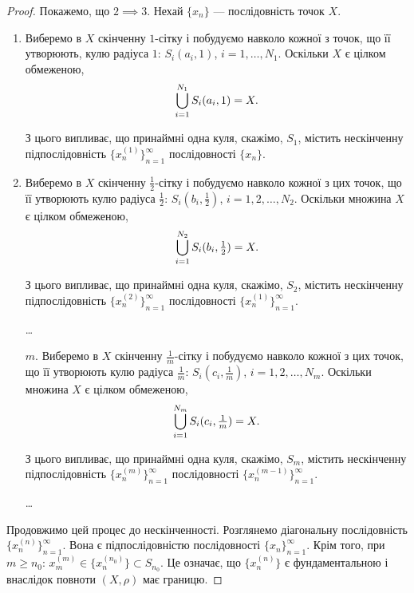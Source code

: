 \begin{proof}
Покажемо, що $2 \implies 3$. Нехай $\{x_n\}$ --- послідовність
точок $X$.
\begin{enumerate}
\item Виберемо в $X$ скінченну $1$-сітку і побудуємо навколо
кожної з точок, що її утворюють, кулю радіуса $1$:
$S_i(a_i, 1)$, $i = 1, \dots, N_1$. Оскільки $X$ є цілком обмеженою,
\begin{equation*}
    \operatorname*{\bigcup}_{i = 1}^{N_1} S_i(a_i, 1) = X.
\end{equation*}

З цього випливає, що принаймні одна куля, скажімо,
$S_1$, містить нескінченну підпослідовність $\{x_n^{(1)}\}_{n = 1}^\infty$
послідовності $\{x_n\}$.

\item Виберемо в $X$ скінченну $\frac{1}{2}$-сітку і побудуємо навколо
кожної з цих точок, що її утворюють кулю радіуса $\frac{1}{2}$:
$S_i(b_i, \frac{1}{2})$, $i = 1, 2, \dots, N_2$. Оскільки множина $X$ є цілком
обмеженою,
\begin{equation*}
    \operatorname*{\bigcup}_{i = 1}^{N_2} S_i(b_i, \tfrac{1}{2}) = X.
\end{equation*}

З цього випливає, що принаймні одна куля, скажімо,
$S_2$, містить нескінченну підпослідовність $\{x_n^{(2)}\}_{n = 1}^\infty$
послідовності $\{x_n^{(1)}\}_{n = 1}^\infty$.

\dots

\item[$m$.] Виберемо в $X$ скінченну $\frac{1}{m}$-сітку і побудуємо
навколо кожної з цих точок, що її утворюють кулю
радіуса $\frac{1}{m}$: $S_i(c_i, \frac{1}{m})$, $i = 1, 2, \dots, N_m$. Оскільки
множина $X$ є цілком обмеженою,
\begin{equation*}
    \operatorname*{\bigcup}_{i = 1}^{N_m} S_i(c_i, \tfrac{1}{m}) = X.
\end{equation*}

З цього випливає, що принаймні одна куля, скажімо,
$S_m$, містить нескінченну підпослідовність $\{x_n^{(m)}\}_{n = 1}^\infty$
послідовності $\{x_n^{(m - 1)}\}_{n = 1}^\infty$.

\dots
\end{enumerate}

Продовжимо цей процес до нескінченності.
Розглянемо діагональну послідовність $\{x_n^(n)\}_{n = 1}^\infty$. Вона є
підпослідовністю послідовності $\{x_n\}_{n = 1}^\infty$. Крім того, при
$m \ge n_0$: $x_m^{(m)} \in \{x_n^{(n_0)}\} \subset S_{n_0}$.
Це означає, що $\{x_n^{(n)}\}$ є
фундаментальною і внаслідок повноти $(X, \rho)$ має границю.


\end{proof}
